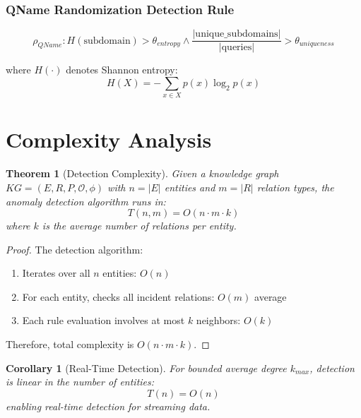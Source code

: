 \documentclass[11pt]{article}
\newtheorem{theorem}{Theorem}
\newtheorem{corollary}{Corollary}
\begin{document}
\subsubsection{QName Randomization Detection Rule}

\begin{equation}
    \rho_{QName}: H(\text{subdomain}) > \theta_{entropy} \land \frac{|\text{unique\_subdomains}|}{|\text{queries}|} > \theta_{uniqueness}
\end{equation}

where $H(\cdot)$ denotes Shannon entropy:
\begin{equation}
    H(X) = -\sum_{x \in X} p(x) \log_2 p(x)
\end{equation}

\section{Complexity Analysis}

\begin{theorem}[Detection Complexity]
Given a knowledge graph $KG = (E, R, P, \mathcal{O}, \phi)$ with $n = |E|$ entities and $m = |R|$ relation types, the anomaly detection algorithm runs in:
\begin{equation}
    T(n, m) = O(n \cdot m \cdot k)
\end{equation}
where $k$ is the average number of relations per entity.
\end{theorem}

\begin{proof}
The detection algorithm:
\begin{enumerate}
    \item Iterates over all $n$ entities: $O(n)$
    \item For each entity, checks all incident relations: $O(m)$ average
    \item Each rule evaluation involves at most $k$ neighbors: $O(k)$
\end{enumerate}
Therefore, total complexity is $O(n \cdot m \cdot k)$.
\end{proof}

\begin{corollary}[Real-Time Detection]
For bounded average degree $k_{max}$, detection is linear in the number of entities:
\begin{equation}
    T(n) = O(n)
\end{equation}
enabling real-time detection for streaming data.
\end{corollary}
\end{document}
